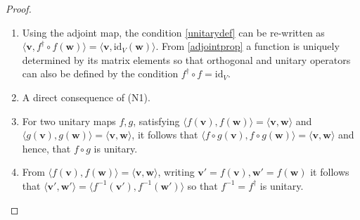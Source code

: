 \documentclass[a4paper,12pt]{report}
\begin{document}
\begin{proof}
    \begin{enumerate}[label=(N\arabic*)]
        \item Using the adjoint map, the condition \cref{unitarydef}  can be re-written as 
        \(\langle \mathbf{v}, f^\dagger \circ f(\mathbf{w}) \rangle = \langle \mathbf{v}, \text{id}_V(\mathbf{w}) \rangle\).
        From \cref{adjointprop}  a function is uniquely determined by its matrix elements so that orthogonal and unitary operators can also be defined by the condition \(f^\dagger \circ f = \text{id}_V.\)
    
        \item A direct consequence of (N1).
    
        \item For two unitary maps \( f, g \), satisfying \( \langle f(\mathbf{v}), f(\mathbf{w}) \rangle = \langle \mathbf{v}, \mathbf{w} \rangle \) and 
        \( \langle g(\mathbf{v}), g(\mathbf{w}) \rangle = \langle \mathbf{v}, \mathbf{w} \rangle \), it follows that 
        \( \langle f \circ g(\mathbf{v}), f \circ g(\mathbf{w}) \rangle = \langle \mathbf{v}, \mathbf{w} \rangle \) and hence, that \( f \circ g \) is unitary.
    
        \item From \( \langle f(\mathbf{v}), f(\mathbf{w}) \rangle = \langle \mathbf{v}, \mathbf{w} \rangle \), writing \( \mathbf{v}' = f(\mathbf{v}), \mathbf{w}' = f(\mathbf{w}) \) it follows that 
        \( \langle \mathbf{v}', \mathbf{w}' \rangle = \langle f^{-1}(\mathbf{v}'), f^{-1}(\mathbf{w}') \rangle \) so that \( f^{-1} = f^\dagger \) is unitary.
    \end{enumerate}
\end{proof}
\end{document}
